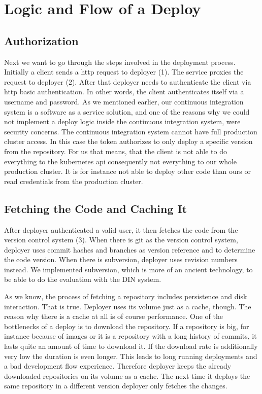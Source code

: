 \section{Logic and Flow of a Deploy}

\subsection{Authorization}

Next we want to go through the steps involved in the deployment process. Initially a
client sends a http request to deployer (1). The service proxies the request to deployer
(2). After that deployer needs to authenticate the client via http basic
authentication. In other words, the client authenticates itself via a username and
password. As we mentioned earlier, our continuous integration system is a software as a
service solution, and one of the reasons why we could not implement a deploy logic inside
the continuous integration system, were security concerns. The continuous integration
system cannot have full production cluster access. In this case the token authorizes to
only deploy a specific version from the repository. For us that means, that the client is
not able to do everything to the kubernetes api consequently not everything to our whole
production cluster. It is for instance not able to deploy other code than ours or read
credentials from the production cluster.

\subsection{Fetching the Code and Caching It}

After deployer authenticated a valid user, it then fetches the code from the version
control system (3). When there is git as the version control system, deployer uses commit
hashes and branches as version reference and to determine the code version. When there is
subversion, deployer uses revision numbers instead. We implemented subversion, which is
more of an ancient technology, to be able to do the evaluation with the DIN system.

As we know, the process of fetching a repository includes persistence and disk
interaction. That is true. Deployer uses its volume just as a cache, though. The reason
why there is a cache at all is of course performance. One of the bottlenecks of a deploy
is to download the repository. If a repository is big, for instance because of images or
it is a repository with a long history of commits, it lasts quite an amount of time to
download it. If the download rate is additionally very low the duration is even
longer. This leads to long running deployments and a bad development flow
experience. Therefore deployer keeps the already downloaded repositories on its volume as
a cache. The next time it deploys the same repository in a different version deployer only
fetches the changes.

